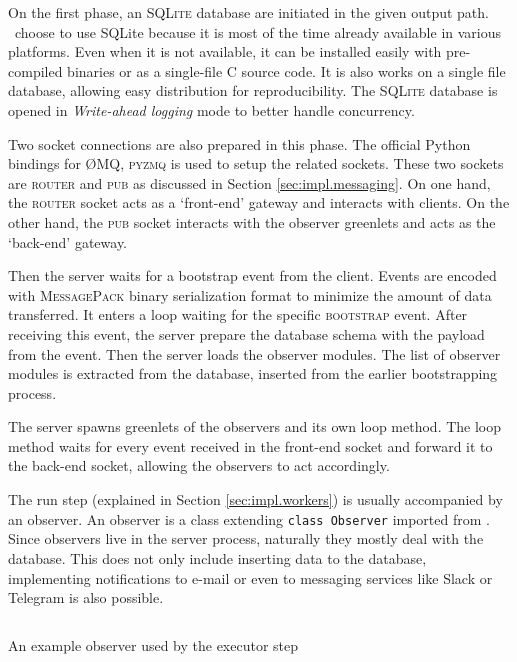 On the first phase, an \textsc{SQLite} database are initiated in the given output path.
\First~choose to use SQLite because it is most of the time already available in various platforms.
Even when it is not available, it can be installed easily with pre-compiled binaries or as a single-file C source code.
It is also works on a single file database, allowing easy distribution for reproducibility.
The \textsc{SQLite} database is opened in \emph{Write-ahead logging} mode to better handle concurrency.

Two socket connections are also prepared in this phase.
The official Python bindings for \O MQ, \textsc{pyzmq} is used to setup the related sockets.
These two sockets are \textsc{router} and \textsc{pub} as discussed in Section \ref{sec:impl.messaging}.
On one hand, the \textsc{router} socket acts as a `front-end' gateway and interacts with clients.
On the other hand, the \textsc{pub} socket interacts with the observer greenlets and acts as the `back-end' gateway.

Then the server waits for a bootstrap event from the client.
Events are encoded with \textsc{MessagePack} binary serialization format to minimize the amount of data transferred.
It enters a loop waiting for the specific \textsc{bootstrap} event.
After receiving this event, the server prepare the database schema with the payload from the event.
Then the server loads the observer modules.
The list of observer modules is extracted from the database, inserted from the earlier bootstrapping process.

The server spawns greenlets of the observers and its own loop method.
The loop method waits for every event received in the front-end socket and forward it to the back-end socket, allowing the observers to act accordingly.

The run step (explained in Section \ref{sec:impl.workers}) is usually accompanied by an observer.
An observer is a class extending \texttt{class Observer} imported from .
Since observers live in the server process, naturally they mostly deal with the database.
This does not only include inserting data to the database, implementing notifications to e-mail or even to messaging services like Slack or Telegram is also possible.

\begin{listing}
    \inputminted[firstline=7,lastline=13]{python}{assets/listings/reprobench/reprobench/executors/base.py}
    \caption{An example observer used by the executor step}
    \label{lst:impl.observer}
\end{listing}

